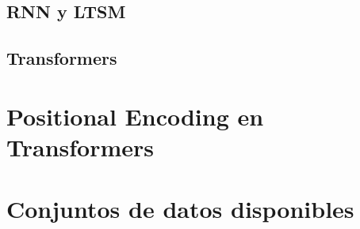 \subsection{RNN y LTSM}
\subsection{Transformers}

\section{Positional Encoding en Transformers}

\section{Conjuntos de datos disponibles}
